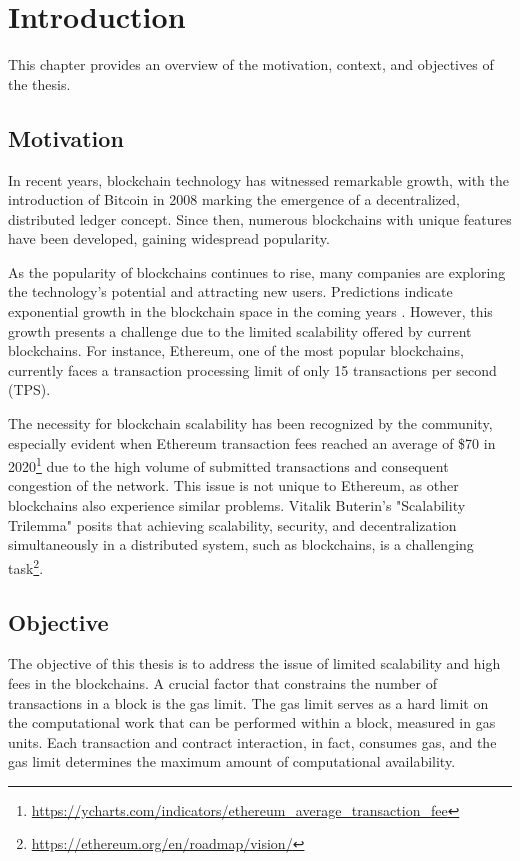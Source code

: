 \chapter{Introduction}\label{cha:chapter1}

This chapter provides an overview of the motivation, context, and objectives of the thesis.

\section{Motivation}\label{sec:moti}

In recent years, blockchain technology has witnessed remarkable growth, with the introduction of Bitcoin in 2008 \cite{nakamoto_bitcoin_2008} marking the emergence of a decentralized, distributed ledger concept. Since then, numerous blockchains with unique features have been developed, gaining widespread popularity.

As the popularity of blockchains continues to rise, many companies are exploring the technology's potential and attracting new users. Predictions indicate exponential growth in the blockchain space in the coming years \cite{noauthor_global_nodate}. However, this growth presents a challenge due to the limited scalability offered by current blockchains. For instance, Ethereum, one of the most popular blockchains, currently faces a transaction processing limit of only 15 transactions per second (TPS).

The necessity for blockchain scalability has been recognized by the community, especially evident when Ethereum transaction fees reached an average of \$70 in 2020\footnote{\url{https://ycharts.com/indicators/ethereum_average_transaction_fee}} due to the high volume of submitted transactions and consequent congestion of the network. This issue is not unique to Ethereum, as other blockchains also experience similar problems. Vitalik Buterin's "Scalability Trilemma" posits that achieving scalability, security, and decentralization simultaneously in a distributed system, such as blockchains, is a challenging task\footnote{\url{https://ethereum.org/en/roadmap/vision/}}.

\section{Objective}\label{sec:objective}

The objective of this thesis is to address the issue of limited scalability and high fees in the blockchains. A crucial factor that constrains the number of transactions in a block is the gas limit. The gas limit serves as a hard limit on the computational work that can be performed within a block, measured in gas units. Each transaction and contract interaction, in fact, consumes gas, and the gas limit determines the maximum amount of computational availability.

